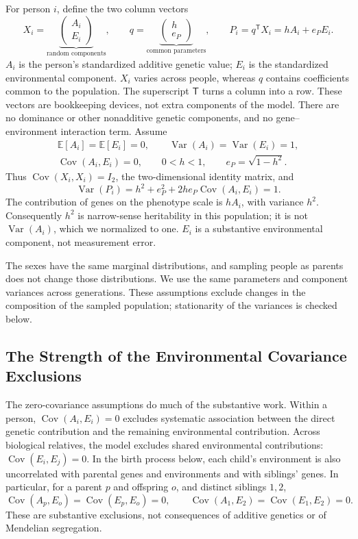 For person $i$, define the two column vectors
\[
 X_i=\underbrace{\begin{pmatrix}A_i\\E_i\end{pmatrix}}_{\text{random components}},
 \qquad
 q=\underbrace{\begin{pmatrix}h\\e_P\end{pmatrix}}_{\text{common parameters}},
 \qquad P_i=q^{\mathsf T}X_i=hA_i+e_P E_i.
\]
$A_i$ is the person's standardized additive genetic value; $E_i$ is the
standardized environmental component. $X_i$ varies across people, whereas
$q$ contains coefficients common to the population. The superscript
$\mathsf T$ turns a column into a row. These vectors are bookkeeping
devices, not extra components of the model. There are no dominance or other nonadditive genetic components, and no gene--environment interaction term. Assume
\begin{equation}
 \begin{gathered}
 \mathbb E[A_i]=\mathbb E[E_i]=0,\qquad
 \operatorname{Var}(A_i)=\operatorname{Var}(E_i)=1,\\
 \operatorname{Cov}(A_i,E_i)=0,\qquad
 0<h<1,\qquad e_P=\sqrt{1-h^2}.
 \end{gathered}
 \label{eq:model-raw}
\end{equation}
Thus $\operatorname{Cov}(X_i,X_i)=I_2$, the two-dimensional identity
matrix, and
\[
 \operatorname{Var}(P_i)=h^2+e_P^2+2h e_P\operatorname{Cov}(A_i,E_i)=1.
\]
The contribution of genes on the phenotype scale is $hA_i$, with variance
$h^2$. Consequently $h^2$ is narrow-sense heritability in this population;
it is not $\operatorname{Var}(A_i)$, which we normalized to one.
$E_i$ is a substantive environmental component, not measurement error.

The sexes have the same marginal distributions, and sampling people as
parents does not change those distributions. We use the same parameters
and component variances across generations. These assumptions exclude
changes in the composition of the sampled population; stationarity of
the variances is checked below.

\subsection{The Strength of the Environmental Covariance Exclusions}
\label{sec:environmental-exclusions}

The zero-covariance assumptions do much of the substantive work. Within
a person, $\operatorname{Cov}(A_i,E_i)=0$ excludes systematic association
between the direct genetic contribution and the remaining environmental
contribution. Across biological relatives, the model excludes shared
environmental contributions: $\operatorname{Cov}(E_i,E_j)=0$. In the birth
process below, each child's environment is also uncorrelated with parental
genes and environments and with siblings' genes. In particular, for a
parent $p$ and offspring $o$, and distinct siblings $1,2$,
\[
 \operatorname{Cov}(A_p,E_o)=\operatorname{Cov}(E_p,E_o)=0,
 \qquad
 \operatorname{Cov}(A_1,E_2)=\operatorname{Cov}(E_1,E_2)=0.
\]
These are substantive exclusions, not consequences of additive genetics
or of Mendelian segregation.

